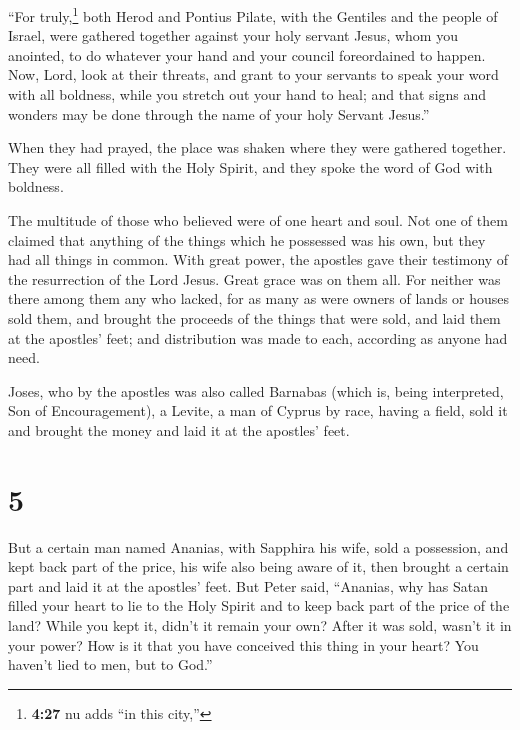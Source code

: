  ``For truly,\footnote{\textbf{4:27} nu adds ``in this
  city,''} both Herod and Pontius Pilate, with the Gentiles and the
people of Israel, were gathered together against your holy servant
Jesus, whom you anointed,  to do whatever your hand and
your council foreordained to happen.  Now, Lord, look at
their threats, and grant to your servants to speak your word with all
boldness,  while you stretch out your hand to heal; and
that signs and wonders may be done through the name of your holy Servant
Jesus.''

 When they had prayed, the place was shaken where they
were gathered together. They were all filled with the Holy Spirit, and
they spoke the word of God with boldness.

 The multitude of those who believed were of one heart
and soul. Not one of them claimed that anything of the things which he
possessed was his own, but they had all things in common.
 With great power, the apostles gave their testimony of
the resurrection of the Lord Jesus. Great grace was on them all.
 For neither was there among them any who lacked, for as
many as were owners of lands or houses sold them, and brought the
proceeds of the things that were sold,  and laid them at
the apostles' feet; and distribution was made to each, according as
anyone had need.

 Joses, who by the apostles was also called Barnabas
(which is, being interpreted, Son of Encouragement), a Levite, a man of
Cyprus by race,  having a field, sold it and brought the
money and laid it at the apostles' feet.

\hypertarget{section-4}{%
\section{5}\label{section-4}}

 But a certain man named Ananias, with Sapphira his wife,
sold a possession,  and kept back part of the price, his
wife also being aware of it, then brought a certain part and laid it at
the apostles' feet.  But Peter said, ``Ananias, why has
Satan filled your heart to lie to the Holy Spirit and to keep back part
of the price of the land?  While you kept it, didn't it
remain your own? After it was sold, wasn't it in your power? How is it
that you have conceived this thing in your heart? You haven't lied to
men, but to God.''

